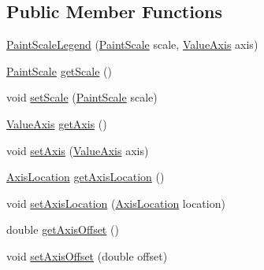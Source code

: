 \subsection*{Public Member Functions}
\begin{DoxyCompactItemize}
\item 
\mbox{\hyperlink{classorg_1_1jfree_1_1chart_1_1title_1_1_paint_scale_legend_aa283014dc8b36eb6eb754705660866b7}{Paint\+Scale\+Legend}} (\mbox{\hyperlink{interfaceorg_1_1jfree_1_1chart_1_1renderer_1_1_paint_scale}{Paint\+Scale}} scale, \mbox{\hyperlink{classorg_1_1jfree_1_1chart_1_1axis_1_1_value_axis}{Value\+Axis}} axis)
\item 
\mbox{\hyperlink{interfaceorg_1_1jfree_1_1chart_1_1renderer_1_1_paint_scale}{Paint\+Scale}} \mbox{\hyperlink{classorg_1_1jfree_1_1chart_1_1title_1_1_paint_scale_legend_ac628c770c4529240f5eb1c013cbb0438}{get\+Scale}} ()
\item 
void \mbox{\hyperlink{classorg_1_1jfree_1_1chart_1_1title_1_1_paint_scale_legend_a35c03ac444a944d89f057e12420b8525}{set\+Scale}} (\mbox{\hyperlink{interfaceorg_1_1jfree_1_1chart_1_1renderer_1_1_paint_scale}{Paint\+Scale}} scale)
\item 
\mbox{\hyperlink{classorg_1_1jfree_1_1chart_1_1axis_1_1_value_axis}{Value\+Axis}} \mbox{\hyperlink{classorg_1_1jfree_1_1chart_1_1title_1_1_paint_scale_legend_a3bbd4958868cd03068068dd6c098df50}{get\+Axis}} ()
\item 
void \mbox{\hyperlink{classorg_1_1jfree_1_1chart_1_1title_1_1_paint_scale_legend_a45cf98fb34e5987f23c42f5d95a52de7}{set\+Axis}} (\mbox{\hyperlink{classorg_1_1jfree_1_1chart_1_1axis_1_1_value_axis}{Value\+Axis}} axis)
\item 
\mbox{\hyperlink{classorg_1_1jfree_1_1chart_1_1axis_1_1_axis_location}{Axis\+Location}} \mbox{\hyperlink{classorg_1_1jfree_1_1chart_1_1title_1_1_paint_scale_legend_a20d245ad308c3f67e6fe3a41d1c66607}{get\+Axis\+Location}} ()
\item 
void \mbox{\hyperlink{classorg_1_1jfree_1_1chart_1_1title_1_1_paint_scale_legend_a28c75f6f500d49d0bb28b0cf02334bea}{set\+Axis\+Location}} (\mbox{\hyperlink{classorg_1_1jfree_1_1chart_1_1axis_1_1_axis_location}{Axis\+Location}} location)
\item 
double \mbox{\hyperlink{classorg_1_1jfree_1_1chart_1_1title_1_1_paint_scale_legend_a94ff06f97ef21ee084df263ad1aa55d3}{get\+Axis\+Offset}} ()
\item 
void \mbox{\hyperlink{classorg_1_1jfree_1_1chart_1_1title_1_1_paint_scale_legend_aba46d6de1dca8b8adc85598dac3d93c0}{set\+Axis\+Offset}} (double offset)

\end{DoxyCompactItemize}
